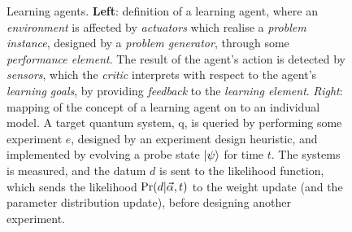 \begin{figure}
\begin{minipage}[c]{0.4\textwidth}
    \end{minipage}


    \caption[Learning agents]{
        Learning agents. \textbf{Left}: definition of a learning agent, where an \emph{environment} is affected by 
        \emph{actuators} which realise a \emph{problem instance}, designed by a \emph{problem generator}, through some \emph{performance element}. 
        The result of the agent's action is detected by \emph{sensors}, which the \emph{critic} interprets with respect to
        the agent's \emph{learning goals}, by providing \emph{feedback} to the \emph{learning element}. 
        \emph{Right}: mapping of the concept of a learning agent on to an individual model. 
        A target quantum system, \gls{q}, is queried by performing some \gls{experiment} $e$, 
        designed by an \gls{experiment} design heuristic, and implemented by evolving a \gls{probe} state $\ket{\psi}$ for time $t$. 
        The systems is measured, and the datum $d$ is sent to the  \gls{likelihood} function, which sends the \gls{likelihood} $\Pr(d|\vec{\alpha}, t)$
        to the weight update (and the parameter distribution update), before designing another experiment. 
    }
    \label{fig:learning_agent}
\end{figure}

   